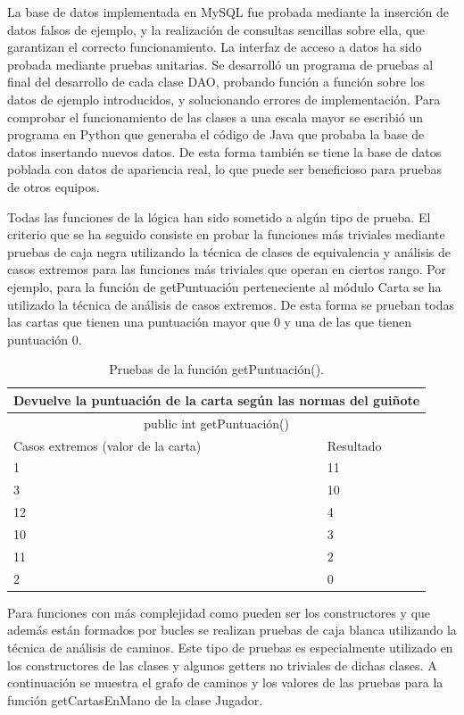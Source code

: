 La base de datos implementada en MySQL fue probada mediante la inserción de datos falsos de ejemplo, y la realización de consultas sencillas sobre ella, que garantizan el correcto funcionamiento. La interfaz de acceso a datos ha sido probada mediante pruebas unitarias. Se desarrolló un programa de pruebas al final del desarrollo de cada clase DAO, probando función a función sobre los datos de ejemplo introducidos, y solucionando errores de implementación. Para comprobar el funcionamiento de las clases a una escala mayor se escribió un programa en Python que generaba el código de Java que probaba la base de datos insertando nuevos datos. De esta forma también se tiene la base de datos poblada con datos de apariencia real, lo que puede ser beneficioso para pruebas de otros equipos.

Todas las funciones de la lógica han sido sometido a algún tipo de prueba. El criterio que se ha seguido consiste en probar la funciones más triviales mediante pruebas de caja negra utilizando la técnica de clases de equivalencia y análisis de casos extremos para las funciones más triviales que operan en ciertos rango. 
Por ejemplo, para la función de getPuntuación perteneciente al módulo Carta se ha utilizado la técnica de análisis de casos extremos. De esta forma se prueban todas las cartas que tienen una puntuación mayor que 0 y una de las que tienen puntuación 0.

\begin{table}[htb]
\centering
\begin{tabular}{|l|l|}
\hline
\multicolumn{2}{|c|}{Devuelve la puntuación de la carta según las normas del guiñote} \\ \hline
\multicolumn{2}{|c|}{public int getPuntuación()} \\ \hline
Casos extremos (valor de la carta) & Resultado \\ \hline
   	1 & 11 \\ \hline
	3 & 10 \\ \hline
	12 & 4 \\ \hline
	10 & 3 \\ \hline
	11 & 2 \\ \hline
	2 & 0 \\ \hline
 \end{tabular}
 \caption{Pruebas de la función getPuntuación().}
\label{}
\end{table}

Para funciones con más complejidad como pueden ser los constructores y que además están formados por bucles se realizan pruebas de caja blanca utilizando la técnica de análisis de caminos. Este tipo de pruebas es especialmente utilizado en los constructores de las clases y algunos getters no triviales de dichas clases. 
A continuación se muestra el grafo de caminos y los valores de las pruebas para la función getCartasEnMano de la clase Jugador.

